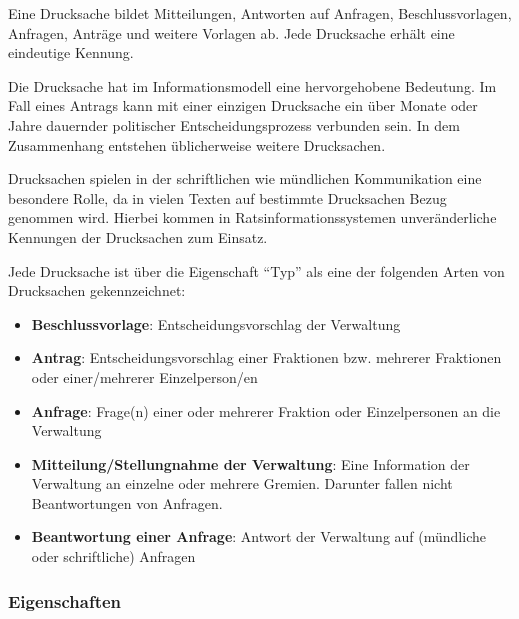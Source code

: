 \documentclass[,a4paper]{article}
\begin{document}

Eine Drucksache bildet Mitteilungen, Antworten auf Anfragen,
Beschlussvorlagen, Anfragen, Anträge und weitere Vorlagen ab. Jede
Drucksache erhält eine eindeutige Kennung.

Die Drucksache hat im Informationsmodell eine hervorgehobene Bedeutung.
Im Fall eines Antrags kann mit einer einzigen Drucksache ein über Monate
oder Jahre dauernder politischer Entscheidungsprozess verbunden sein. In
dem Zusammenhang entstehen üblicherweise weitere Drucksachen.

Drucksachen spielen in der schriftlichen wie mündlichen Kommunikation
eine besondere Rolle, da in vielen Texten auf bestimmte Drucksachen
Bezug genommen wird. Hierbei kommen in Ratsinformationssystemen
unveränderliche Kennungen der Drucksachen zum Einsatz.

Jede Drucksache ist über die Eigenschaft ``Typ'' als eine der folgenden
Arten von Drucksachen gekennzeichnet:

\begin{itemize}
\itemsep1pt\parskip0pt
\item
  \textbf{Beschlussvorlage}: Entscheidungsvorschlag der Verwaltung
\item
  \textbf{Antrag}: Entscheidungsvorschlag einer Fraktionen bzw. mehrerer
  Fraktionen oder einer/mehrerer Einzelperson/en
\item
  \textbf{Anfrage}: Frage(n) einer oder mehrerer Fraktion oder
  Einzelpersonen an die Verwaltung
\item
  \textbf{Mitteilung/Stellungnahme der Verwaltung}: Eine Information der
  Verwaltung an einzelne oder mehrere Gremien. Darunter fallen nicht
  Beantwortungen von Anfragen.
\item
  \textbf{Beantwortung einer Anfrage}: Antwort der Verwaltung auf
  (mündliche oder schriftliche) Anfragen
\end{itemize}

\subsubsection{Eigenschaften}\label{eigenschaften-6}
\end{document}
